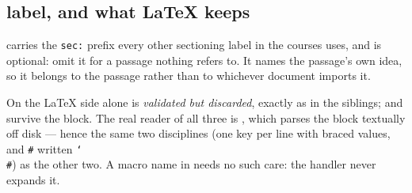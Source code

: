 \subsection*{label, and what \LaTeX{} keeps}

 carries the \texttt{sec:} prefix every other sectioning label in the
courses uses, and is optional: omit it for a passage nothing refers to. It names
the passage's own idea, so it belongs to the passage rather than to whichever
document imports it.

On the \LaTeX{} side  alone is \emph{validated but discarded},
exactly as in the siblings;  and  survive the block. The
real reader of all three is , which parses the
block textually off disk --- hence the same two disciplines (one key per line
with braced values, and \texttt{\#} written \texttt{\char`\\\#}) as the other two.
A macro name in  needs no such care: the handler never expands it.
